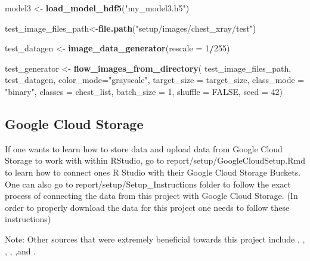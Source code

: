 \documentclass[12pt]{article}
\newenvironment{Shaded}{\begin{snugshade}}{\end{snugshade}}
\newcommand{\DataTypeTok}[1]{\textcolor[rgb]{0.13,0.29,0.53}{#1}}
\newcommand{\DecValTok}[1]{\textcolor[rgb]{0.00,0.00,0.81}{#1}}
\newcommand{\KeywordTok}[1]{\textcolor[rgb]{0.13,0.29,0.53}{\textbf{#1}}}
\newcommand{\NormalTok}[1]{#1}
\newcommand{\OperatorTok}[1]{\textcolor[rgb]{0.81,0.36,0.00}{\textbf{#1}}}
\newcommand{\OtherTok}[1]{\textcolor[rgb]{0.56,0.35,0.01}{#1}}
\newcommand{\StringTok}[1]{\textcolor[rgb]{0.31,0.60,0.02}{#1}}
\begin{document}
\begin{Shaded}
\begin{Highlighting}[]
\NormalTok{model3 <-}\StringTok{ }\KeywordTok{load_model_hdf5}\NormalTok{(}\StringTok{"my_model3.h5"}\NormalTok{)}

\NormalTok{test_image_files_path<-}\KeywordTok{file.path}\NormalTok{(}\StringTok{"setup/images/chest_xray/test"}\NormalTok{)}

\NormalTok{test_datagen <-}\StringTok{ }\KeywordTok{image_data_generator}\NormalTok{(}\DataTypeTok{rescale =} \DecValTok{1}\OperatorTok{/}\DecValTok{255}\NormalTok{)}

\NormalTok{test_generator <-}\StringTok{ }\KeywordTok{flow_images_from_directory}\NormalTok{(}
\NormalTok{        test_image_files_path,}
\NormalTok{        test_datagen,}
        \DataTypeTok{color_mode=}\StringTok{"grayscale"}\NormalTok{,}
        \DataTypeTok{target_size =}\NormalTok{ target_size,}
        \DataTypeTok{class_mode =} \StringTok{"binary"}\NormalTok{,}
        \DataTypeTok{classes =}\NormalTok{ chest_list,}
        \DataTypeTok{batch_size =} \DecValTok{1}\NormalTok{,}
        \DataTypeTok{shuffle =} \OtherTok{FALSE}\NormalTok{,}
        \DataTypeTok{seed =} \DecValTok{42}\NormalTok{)}
\end{Highlighting}
\end{Shaded}

\begin{Shaded}
\end{Shaded}

\hypertarget{google-cloud-storage}{%
\subsection{Google Cloud Storage}\label{google-cloud-storage}}

If one wants to learn how to store data and upload data from Google
Cloud Storage to work with within RStudio, go to
report/setup/GoogleCloudSetup.Rmd to learn how to connect ones R Studio
with their Google Cloud Storage Buckets. One can also go to
report/setup/Setup\_Instructions folder to follow the exact process of
connecting the data from this project with Google Cloud Storage. (In
order to properly download the data for this project one needs to follow
these instructions)

Note: Other sources that were extremely beneficial towards this project
include \citep{PAD}, \citep{Medium}, \citep{CloudStorage},
\citep{Kaggle}, \citep{RPubs},and \citep{Shirin}. \newpage



\end{document}
